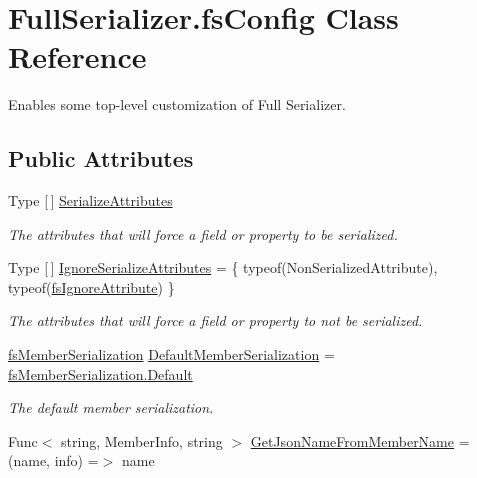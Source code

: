 \hypertarget{class_full_serializer_1_1fs_config}{}\section{Full\+Serializer.\+fs\+Config Class Reference}
\label{class_full_serializer_1_1fs_config}


Enables some top-\/level customization of Full Serializer.  


\subsection*{Public Attributes}
\begin{DoxyCompactItemize}
\item 
Type \mbox{[}$\,$\mbox{]} \hyperlink{class_full_serializer_1_1fs_config_a1b66d003197f0f22d9bd1b653a7d01b6}{Serialize\+Attributes}
\begin{DoxyCompactList}\small\item\em The attributes that will force a field or property to be serialized. \end{DoxyCompactList}\item 
Type \mbox{[}$\,$\mbox{]} \hyperlink{class_full_serializer_1_1fs_config_a0e7f86c3533205a53f6c6d1218696e4c}{Ignore\+Serialize\+Attributes} = \{ typeof(Non\+Serialized\+Attribute), typeof(\hyperlink{class_full_serializer_1_1fs_ignore_attribute}{fs\+Ignore\+Attribute}) \}
\begin{DoxyCompactList}\small\item\em The attributes that will force a field or property to {\itshape not} be serialized. \end{DoxyCompactList}\item 
\hyperlink{namespace_full_serializer_ad0dc98cd54a3d07f8c579d82585906f8}{fs\+Member\+Serialization} \hyperlink{class_full_serializer_1_1fs_config_a6fc2b4e7460aeb38f38df78273bf2788}{Default\+Member\+Serialization} = \hyperlink{namespace_full_serializer_ad0dc98cd54a3d07f8c579d82585906f8a7a1920d61156abc05a60135aefe8bc67}{fs\+Member\+Serialization.\+Default}
\begin{DoxyCompactList}\small\item\em The default member serialization. \end{DoxyCompactList}\item 
Func$<$ string, Member\+Info, string $>$ \hyperlink{class_full_serializer_1_1fs_config_a2748a43e18efe642c9cbe4d74583c554}{Get\+Json\+Name\+From\+Member\+Name} = (name, info) =$>$ name

\end{DoxyCompactItemize}
